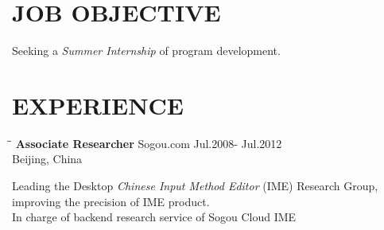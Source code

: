 \documentclass{res}
\begin{document}
 


\address{\bf  ADDRESS\\Donald Bren Hall, Room 2062\\University of California,Irvine\\Irvine,CA 92967}
\address{\bf  CONTACT\\jianfeng.jia@gmail.com\\jianfeng.jia@uci.edu\\(949) 678-9893}
                                  
\begin{resume}

\section{JOB OBJECTIVE}          
    Seeking a \emph{Summer Internship} of program development.

\section{EXPERIENCE}
   \vspace{-0.1in}	
   \begin{tabbing}
   \hspace{2.3in}\= \hspace{2.6in}\= \kill %
    {\bf Associate Researcher} \>Sogou.com     \>Jul.2008- Jul.2012\\
                             \>Beijing, China
   \end{tabbing}\vspace{-20pt}      %
   Leading the Desktop \emph{Chinese Input Method Editor} (IME) Research Group,
    improving the precision of IME product. \\
    In charge of backend research service of Sogou Cloud IME


\end{resume}
\end{document}
